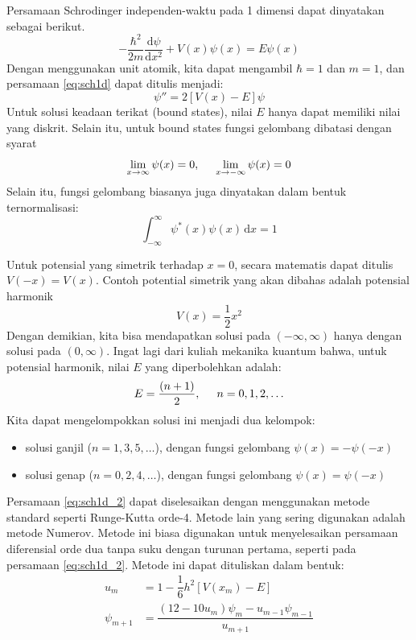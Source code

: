 \documentclass[10pt,bahasa]{article}
\begin{document}
Persamaan Schrodinger independen-waktu pada 1 dimensi
dapat dinyatakan sebagai berikut.
\begin{equation}
-\frac{\hbar^2}{2m}\frac{\mathrm{d}\psi}{\mathrm{d}x^2}
+ V(x)\psi(x) = E\psi(x)
\label{eq:sch1d}
\end{equation}
Dengan menggunakan unit atomik, kita dapat mengambil $\hbar = 1$
dan $m = 1$, dan persamaan \eqref{eq:sch1d} dapat ditulis menjadi:
\begin{equation}
\psi'' = 2\left[ V(x) - E \right]\psi
\label{eq:sch1d_2}
\end{equation}
Untuk solusi keadaan terikat (bound states), nilai $E$ hanya dapat memiliki
nilai yang diskrit. Selain itu, untuk bound states
fungsi gelombang dibatasi dengan syarat
\begin{equation}
\lim_{x\rightarrow\infty} \psi(x) = 0,\hspace{0.5cm}\lim_{x\rightarrow-\infty} \psi(x) = 0
\end{equation}
Selain itu, fungsi gelombang biasanya juga dinyatakan dalam bentuk ternormalisasi:
\begin{equation}
\int_{-\infty}^{\infty} \psi^{*}(x) \psi(x)\,\mathrm{d}x = 1
\end{equation}

Untuk potensial yang simetrik terhadap $x=0$, secara matematis dapat ditulis
$V(-x) = V(x)$. Contoh potential simetrik yang akan dibahas adalah potensial harmonik
\begin{equation}
V(x) = \frac{1}{2}x^2
\end{equation}
Dengan demikian, kita bisa mendapatkan solusi pada $(-\infty,\infty)$ hanya dengan
solusi pada $(0,\infty)$.
Ingat lagi dari kuliah mekanika kuantum bahwa,
untuk potensial harmonik, nilai $E$ yang diperbolehkan adalah:
\begin{equation}
E = \frac{(n + 1)}{2}, \hspace{0.5cm} n = 0,1,2,\ldots
\end{equation}
Kita dapat mengelompokkan solusi ini menjadi dua kelompok:
\begin{itemize}
\item solusi ganjil ($n = 1, 3, 5, \ldots$), dengan fungsi gelombang
$\psi(x) = -\psi(-x)$
\item solusi genap ($n = 0, 2, 4, \ldots$), dengan fungsi gelombang
$\psi(x) = \psi(-x)$
\end{itemize}

Persamaan \eqref{eq:sch1d_2} dapat diselesaikan dengan
menggunakan metode standard seperti Runge-Kutta
orde-4. Metode lain yang sering digunakan adalah metode Numerov. Metode ini biasa
digunakan untuk menyelesaikan persamaan diferensial orde dua tanpa suku dengan turunan
pertama, seperti pada persamaan \eqref{eq:sch1d_2}.
Metode ini dapat dituliskan dalam bentuk:
\begin{align}
u_{m} & = 1 - \dfrac{1}{6}h^2 \left[ V(x_m) - E \right] \\
\psi_{m+1} & = \dfrac{\left(12 - 10u_{m}\right)\psi_{m} - u_{m-1}\psi_{m-1}}{u_{m+1}}
\end{align}
\end{document}
